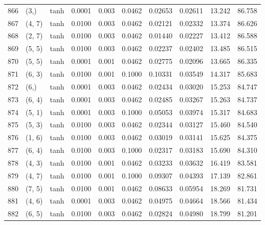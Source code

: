 \begin{tabular}{lllrrrrrrr}
866 &        (3,) &      tanh &  0.0001 &  0.003 &  0.0462 &          0.02653 &    0.02611 &      13.242 &    86.758 \\
867 &      (4, 7) &      tanh &  0.0100 &  0.003 &  0.0462 &          0.02121 &    0.02332 &      13.374 &    86.626 \\
868 &      (2, 7) &      tanh &  0.0100 &  0.003 &  0.0462 &          0.01440 &    0.02227 &      13.412 &    86.588 \\
869 &      (5, 5) &      tanh &  0.0100 &  0.003 &  0.0462 &          0.02237 &    0.02402 &      13.485 &    86.515 \\
870 &      (5, 5) &      tanh &  0.0001 &  0.001 &  0.0462 &          0.02775 &    0.02096 &      13.665 &    86.335 \\
871 &      (6, 3) &      tanh &  0.0100 &  0.001 &  0.1000 &          0.10331 &    0.03549 &      14.317 &    85.683 \\
872 &        (6,) &      tanh &  0.0001 &  0.003 &  0.0462 &          0.02434 &    0.03020 &      15.253 &    84.747 \\
873 &      (6, 4) &      tanh &  0.0001 &  0.003 &  0.0462 &          0.02485 &    0.03267 &      15.263 &    84.737 \\
874 &      (5, 1) &      tanh &  0.0001 &  0.003 &  0.1000 &          0.05053 &    0.03974 &      15.317 &    84.683 \\
875 &      (5, 3) &      tanh &  0.0100 &  0.003 &  0.0462 &          0.02344 &    0.03127 &      15.460 &    84.540 \\
876 &      (1, 6) &      tanh &  0.0100 &  0.003 &  0.0462 &          0.03019 &    0.03141 &      15.625 &    84.375 \\
877 &      (6, 4) &      tanh &  0.0100 &  0.003 &  0.1000 &          0.02317 &    0.03183 &      15.690 &    84.310 \\
878 &      (4, 3) &      tanh &  0.0100 &  0.001 &  0.0462 &          0.03233 &    0.03632 &      16.419 &    83.581 \\
879 &      (4, 7) &      tanh &  0.0100 &  0.001 &  0.1000 &          0.09307 &    0.04393 &      17.139 &    82.861 \\
880 &      (7, 5) &      tanh &  0.0100 &  0.001 &  0.0462 &          0.08633 &    0.05954 &      18.269 &    81.731 \\
881 &      (4, 6) &      tanh &  0.0001 &  0.003 &  0.0462 &          0.04975 &    0.04664 &      18.566 &    81.434 \\
882 &      (6, 5) &      tanh &  0.0100 &  0.003 &  0.0462 &          0.02824 &    0.04980 &      18.799 &    81.201 \\

\end{tabular}
